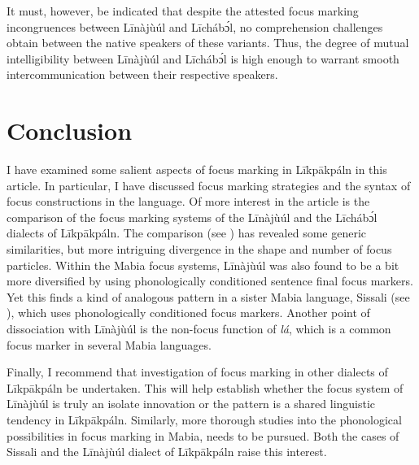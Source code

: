 \documentclass[output=paper,colorlinks,citecolor=brown]{langscibook}
\begin{document}
It must, however, be indicated that despite the attested focus marking incongruences between Līnàjùúl and Līcháb\'{ɔ}l, no comprehension challenges obtain between the native speakers of these variants. Thus, the degree of mutual intelligibility between Līnàjùúl and Līcháb\'{ɔ}l is high enough to warrant smooth intercommunication between their respective speakers.

\section{Conclusion}\label{sec:bisilki:9}

I have examined some salient aspects of focus marking in Līkpākpáln in this article. In particular, I have discussed focus marking strategies and the syntax of focus constructions in the language. Of more interest in the article is the comparison of the focus marking systems of the Līnàjùúl and the Līcháb\'{ɔ}l dialects of Līkpākpáln. The comparison (see ) has revealed some generic similarities, but more intriguing divergence in the shape and number of focus particles. Within the Mabia focus systems, Līnàjùúl was also found to be a bit more diversified by using phonologically conditioned sentence final focus markers. Yet this finds a kind of analogous pattern in a sister Mabia language, Sissali (see ), which uses phonologically conditioned focus markers. Another point of dissociation with Līnàjùúl is the non-focus function of \textit{lá}, which is a common focus marker in several Mabia languages.

Finally, I recommend that investigation of focus marking in other dialects of Līkpākpáln be undertaken. This will help establish whether the focus system of Līnàjùúl is truly an isolate innovation or  the pattern is a shared linguistic tendency in Līkpākpáln. Similarly, more thorough studies into the phonological possibilities in focus marking in Mabia, needs to be pursued. Both the cases of Sissali and the Līnàjùúl dialect of Līkpākpáln raise this interest.
\end{document}
